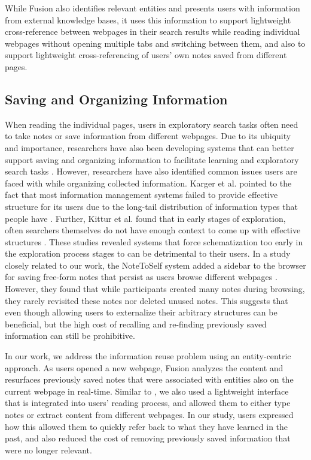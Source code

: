 While Fusion also identifies relevant entities and presents users with information from external knowledge bases, it uses this information to support lightweight cross-reference between webpages  in their search results while reading individual webpages without opening multiple tabs and switching between them, and also to support lightweight cross-referencing of users' own notes saved from different pages.

\subsection{Saving and Organizing Information}

When reading the individual pages, users in exploratory search tasks often need to take notes or save information from different webpages. Due to its ubiquity and importance, researchers have also been developing systems that can better support saving and organizing information to facilitate learning and exploratory search tasks \cite{schilit1998beyond, tashman2011liquidtext,hinckley2012informal,kittur2013costs,notetoself,chang2016supporting}. 
However, researchers have also identified common issues users are faced with while organizing collected information. Karger et al. pointed to the fact that most information management systems failed to provide effective structure for its users due to the long-tail distribution of information types that people have \cite{whatwentwrong}. Further, Kittur et al. found that in early stages of exploration, often searchers themselves do not have enough context to come up with effective structures \cite{kittur2013costs}. These studies revealed systems that force schematization too early in the exploration process stages to can be detrimental to their users. In a study closely related to our work, the NoteToSelf system added a sidebar to the browser for saving free-form notes that persist as users browse different webpages \cite{notetoself}. However, they found that while participants created many notes during browsing, they rarely revisited these notes nor deleted unused notes. This suggests that even though allowing users to externalize their arbitrary structures can be beneficial, but the high cost of recalling and re-finding previously saved information can still be prohibitive.

In our work, we address the information reuse problem using an entity-centric approach. As users opened a new webpage, Fusion analyzes the content and resurfaces previously saved notes that were associated with entities also on the current webpage in real-time. Similar to \cite{notetoself}, we also used a lightweight interface that is integrated into users' reading process, and allowed them to either type notes or extract content from different webpages. In our study, users expressed how this allowed them to quickly refer back to what they have learned in the past, and also reduced the cost of removing previously saved information that were no longer relevant. 

